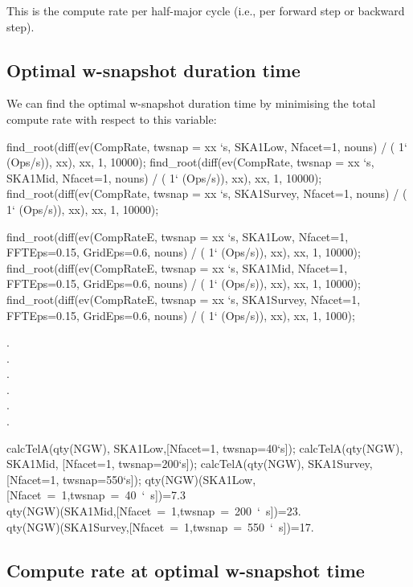\documentclass[useAMS,usenatbib,referee]{article}
\begin{document}
This is the compute rate per half-major cycle (i.e., per forward step
or backward step).



\subsection{Optimal w-snapshot duration time}

We can find the optimal w-snapshot duration time by minimising the
total compute rate with respect to this variable:
\begin{maxima}[]
find_root(diff(ev(CompRate, twsnap = xx `s, SKA1Low, Nfacet=1, nouns) / ( 1` (Ops/s)), xx), xx, 1, 10000);
find_root(diff(ev(CompRate, twsnap = xx `s, SKA1Mid, Nfacet=1, nouns) / ( 1` (Ops/s)), xx), xx, 1, 10000);
find_root(diff(ev(CompRate, twsnap = xx `s, SKA1Survey, Nfacet=1, nouns) / ( 1` (Ops/s)), xx), xx, 1, 10000);

find_root(diff(ev(CompRateE, twsnap = xx `s, SKA1Low, Nfacet=1, FFTEps=0.15, GridEps=0.6, nouns) / ( 1` (Ops/s)), xx), xx, 1, 10000);
find_root(diff(ev(CompRateE, twsnap = xx `s, SKA1Mid, Nfacet=1, FFTEps=0.15, GridEps=0.6, nouns) / ( 1` (Ops/s)), xx), xx, 1, 10000);
find_root(diff(ev(CompRateE, twsnap = xx `s, SKA1Survey, Nfacet=1, FFTEps=0.15, GridEps=0.6, nouns) / ( 1` (Ops/s)), xx), xx, 1, 1000);

\maximaoutput*
{}. \\
. \\
. \\
. \\
. \\
. \\
\end{maxima}


\begin{maxima}[]
calcTelA(qty(NGW),  SKA1Low,[Nfacet=1, twsnap=40`s]);
calcTelA(qty(NGW), SKA1Mid, [Nfacet=1, twsnap=200`s]);
calcTelA(qty(NGW), SKA1Survey, [Nfacet=1, twsnap=550`s]);
\maximaoutput*
\m  \mbox{{}qty(NGW)(SKA1Low,[Nfacet = 1,twsnap = 40 ` s]){}}=7.3 \\
\m  \mbox{{}qty(NGW)(SKA1Mid,[Nfacet = 1,twsnap = 200 ` s]){}}=23. \\
\m  \mbox{{}qty(NGW)(SKA1Survey,[Nfacet = 1,twsnap = 550 ` s]){}}=17. \\
\end{maxima}

\subsection{Compute rate at optimal w-snapshot time}
\label{sec:wsnapshot-opt-rate}
\end{document}
